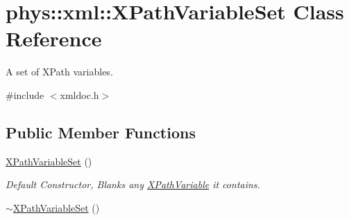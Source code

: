 \hypertarget{classphys_1_1xml_1_1XPathVariableSet}{
\section{phys::xml::XPathVariableSet Class Reference}
\label{df/dd1/classphys_1_1xml_1_1XPathVariableSet}
}


A set of XPath variables.  




{\ttfamily \#include $<$xmldoc.h$>$}

\subsection*{Public Member Functions}
\begin{DoxyCompactItemize}
\item 
\hypertarget{classphys_1_1xml_1_1XPathVariableSet_a34733feeb7720d30c2a752f6f9cd6858}{
\hyperlink{classphys_1_1xml_1_1XPathVariableSet_a34733feeb7720d30c2a752f6f9cd6858}{XPathVariableSet} ()}
\label{df/dd1/classphys_1_1xml_1_1XPathVariableSet_a34733feeb7720d30c2a752f6f9cd6858}

\begin{DoxyCompactList}\small\item\em Default Constructor, Blanks any \hyperlink{classphys_1_1xml_1_1XPathVariable}{XPathVariable} it contains. \item\end{DoxyCompactList}\item 
\hypertarget{classphys_1_1xml_1_1XPathVariableSet_af9ac0b922e9399a30ee81a59eb44e464}{
\hyperlink{classphys_1_1xml_1_1XPathVariableSet_af9ac0b922e9399a30ee81a59eb44e464}{$\sim$XPathVariableSet} ()}
\label{df/dd1/classphys_1_1xml_1_1XPathVariableSet_af9ac0b922e9399a30ee81a59eb44e464}


\end{DoxyCompactItemize}
